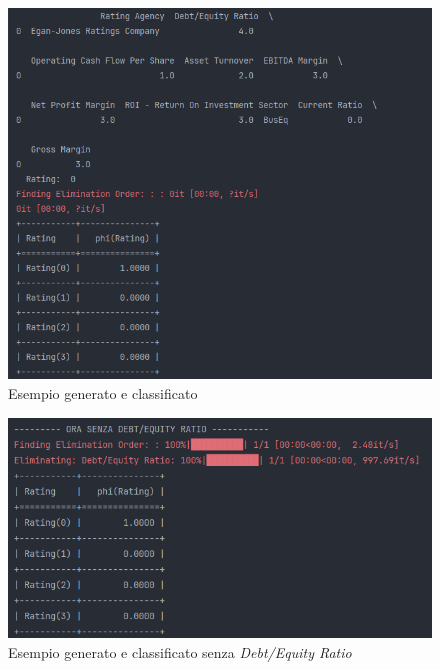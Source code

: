 \begin{figure}[H]
    \centering
    \includegraphics[scale=0.5]{img/sample_generated_bn.png}
    \caption{Esempio generato e classificato}
    \label{fig:normal}
\end{figure}

\begin{figure}[H]
    \centering
    \includegraphics[scale=0.5]{img/sample_generated_bn_without.png}
    \caption{Esempio generato e classificato senza \textit{Debt/Equity Ratio}}
    \label{fig:without}
\end{figure}

